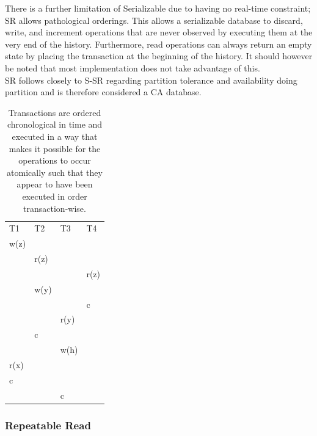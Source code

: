 \documentclass[a4paper,10pt,titlepage]{report}
\begin{document}
There is a further limitation of Serializable due to having no real-time constraint; SR allows pathological orderings. This allows a serializable database to discard, write, and increment operations that are never observed by executing them at the very end of the history. Furthermore, read operations can always return an empty state by placing the transaction at the beginning of the history. It should however be noted that most implementation does not take advantage of this.
\\ \vspace{5mm}
SR follows closely to S-SR regarding partition tolerance and availability doing partition and is therefore considered a CA database.
\\ \vspace{5mm}
\begin{table}[h]
    \begin{tabular}{l|l|l|l}
        T1   & T2   & T3   & T4   \\
        w(z) &      &      &      \\
        & r(z) &      &      \\
        &      &      & r(z) \\
        & w(y) &      &      \\
        &      &      & c    \\
        &      & r(y) &      \\
        & c    &      &      \\
        &      & w(h) &      \\
        r(x) &      &      &      \\
        c    &      &      &      \\
        &      & c    &
    \end{tabular}
    \caption{Transactions are ordered chronological in time and executed in a way that makes it possible for the operations to occur atomically such that they appear to have been executed in order transaction-wise. }
\end{table}
\newpage

\subsubsection{Repeatable Read}
\end{document}
